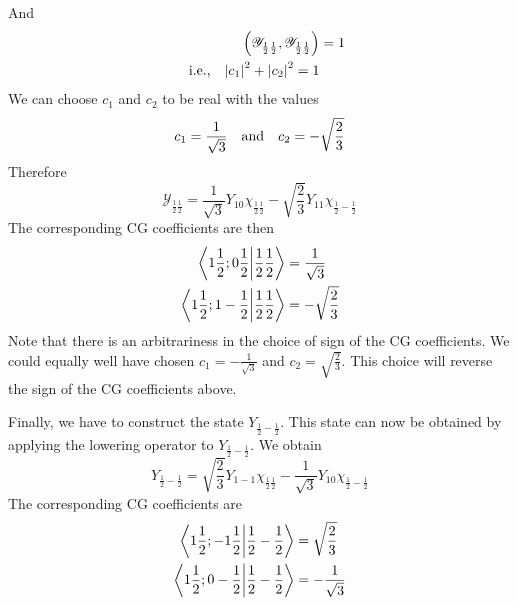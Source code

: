 And
\begin{align}
\qty(\mathcal{Y}_{\frac{1}{2}\frac{1}{2}},\mathcal{Y}_{\frac{1}{2}\frac{1}{2}}) &= 1 \nonumber\\
\label{chapter19.eqn6-spin-orbit}
\qq{i.e.,} \abs{c_1}^2 + \abs{c_2}^2 = 1
\end{align}
We can choose $c_1$ and $c_2$ to be real with the values
\begin{equation}
c_1 = \frac{1}{\sqrt{3}} \qq{and} c_2 = - \sqrt{\frac{2}{3}}
\end{equation}
Therefore
\begin{equation}
\label{chapter19.eqn7-spin-orbit}
\mathcal{Y}_{\frac{1}{2}\frac{1}{2}} = \frac{1}{\sqrt{3}} Y_{1 0}\chi_{\frac{1}{2}\frac{1}{2}} - \sqrt{\frac{2}{3}} Y_{11} \chi_{\frac{1}{2}-\frac{1}{2}}
\end{equation}
The corresponding CG coefficients are then
\begin{align*}
\braket{1\frac{1}{2};0\frac{1}{2}}{\frac{1}{2}\frac{1}{2}} &= \frac{1}{\sqrt{3}} \\
\braket{1 \frac{1}{2}; 1 -\frac{1}{2}}{\frac{1}{2} \frac{1}{2}} &= - \sqrt{\frac{2}{3}}
\end{align*}
Note that there is an arbitrariness in the choice of sign of the CG coefficients. We could equally well have chosen $c_1 = - \frac{1}{\sqrt{3}}$ and $c_2 = \sqrt{\frac{2}{3}}$. This choice will reverse the sign of the CG coefficients above.

Finally, we have to construct the state $Y_{\frac{1}{2}-\frac{1}{2}}$. This state can now be obtained by applying the lowering operator to $Y_{\frac{1}{2}-\frac{1}{2}}$. We obtain
\begin{equation}
\label{chapter19.eqn8-spin-orbit}
Y_{\frac{1}{2}-\frac{1}{2}} = \sqrt{\frac{2}{3}} Y_{1 -1} \chi_{\frac{1}{2}\frac{1}{2}} - \frac{1}{\sqrt{3}} Y_{1 0} \chi_{\frac{1}{2}-\frac{1}{2}}
\end{equation}
The corresponding CG coefficients are 
\begin{align*}
\braket{1 \frac{1}{2}; -1 \frac{1}{2}}{\frac{1}{2}-\frac{1}{2}} &= \sqrt{\frac{2}{3}} \\
\braket{1 \frac{1}{2}; 0 -\frac{1}{2}}{\frac{1}{2} - \frac{1}{2}} &= - \frac{1}{\sqrt{3}}
\end{align*}

